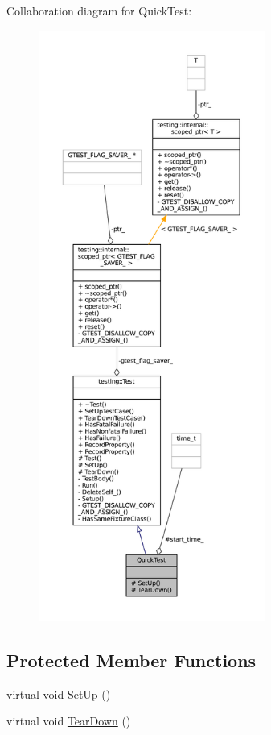 Collaboration diagram for Quick\+Test\+:
\nopagebreak
\begin{figure}[H]
\begin{center}
\leavevmode
\includegraphics[height=550pt]{classQuickTest__coll__graph}
\end{center}
\end{figure}
\subsection*{Protected Member Functions}
\begin{DoxyCompactItemize}
\item 
virtual void \hyperlink{classQuickTest_ae52ad082887512b92240ce40a1a05650}{Set\+Up} ()
\item 
virtual void \hyperlink{classQuickTest_a6b2d16cc0c69d30a16fe612db5abfc39}{Tear\+Down} ()
\end{DoxyCompactItemize}
